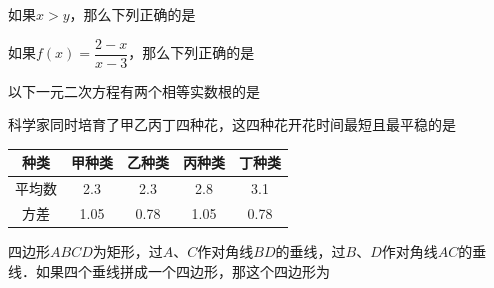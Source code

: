 \documentclass{article}
\begin{document}
\lfoot{}
\rfoot{}
\cfoot{}

\newpage

\cfoot{}




\begin{question}[1]
    \item 如果$x>y$，那么下列正确的是
\end{question}

\begin{question}[2]
    \item 如果$f(x)=\dfrac{2-x}{x-3}$，那么下列正确的是
\end{question}

\begin{question}[3]
    \item 以下一元二次方程有两个相等实数根的是
\end{question}

\begin{question}[4]
    \item 科学家同时培育了甲乙丙丁四种花，这四种花开花时间最短且最平稳的是
    \begin{center}
        \begin{tabular}{|c|c|c|c|c|} \hline
            种类 & 甲种类 & 乙种类 & 丙种类 & 丁种类 \\ \hline
            平均数 & 2.3 & 2.3 & 2.8 & 3.1 \\ \hline
            方差 & 1.05 & 0.78 & 1.05 & 0.78 \\ \hline
        \end{tabular}
    \end{center} \leavevmode
\end{question}

\begin{question}[5]
    \item 四边形$ABCD$为矩形，过$A$、$C$作对角线$BD$的垂线，过$B$、$D$作对角线$AC$的垂线．如果四个垂线拼成一个四边形，那这个四边形为
\end{question}
\end{document}
